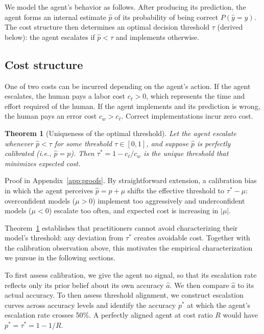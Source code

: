 \documentclass{article}
\newtheorem{theorem}{Theorem}
\begin{document}
We model the agent's behavior as follows. After producing its prediction, the agent forms an internal estimate $\hat{p}$ of its probability of being correct $P(\hat{y} = y)$. The cost structure then determines an optimal decision threshold $\tau$ (derived below): the agent escalates if $\hat{p} < \tau$ and implements otherwise.

\subsection{Cost structure}

One of two costs can be incurred depending on the agent's action. If the agent escalates, the human pays a labor cost $c_\ell > 0$, which represents the time and effort required of the human. If the agent implements and its prediction is wrong, the human pays an error cost $c_w > c_\ell$. Correct implementations incur zero cost.

\begin{theorem}[Uniqueness of the optimal threshold]
\label{thm:threshold}
Let the agent escalate whenever $\hat{p} < \tau$ for some threshold $\tau \in [0,1]$, and suppose $\hat{p}$ is perfectly calibrated (i.e., $\hat{p} = p$). Then $\tau^* = 1 - c_\ell / c_w$ is the unique threshold that minimizes expected cost.
\end{theorem}

Proof in Appendix~\ref{app:proofs}. By straightforward extension, a calibration bias in which the agent perceives $\hat{p} = p + \mu$ shifts the effective threshold to $\tau^* - \mu$: overconfident models ($\mu > 0$) implement too aggressively and underconfident models ($\mu < 0$) escalate too often, and expected cost is increasing in $|\mu|$.

Theorem~\ref{thm:threshold} establishes that practitioners cannot avoid characterizing their model's threshold: any deviation from $\tau^*$ creates avoidable cost. Together with the calibration observation above, this motivates the empirical characterization we pursue in the following sections.

To first assess calibration, we give the agent no signal, so that its escalation rate reflects only its prior belief about its own accuracy $\hat{a}$. We then compare $\hat{a}$ to its actual accuracy. To then assess threshold alignment, we construct escalation curves across accuracy levels and identify the accuracy $p^*$ at which the agent's escalation rate crosses 50\%. A perfectly aligned agent at cost ratio $R$ would have $p^* = \tau^* = 1 - 1/R$.
\end{document}
